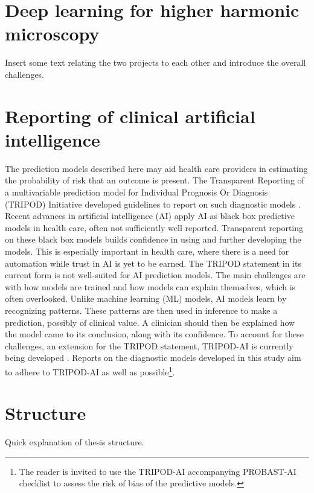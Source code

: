 \section{Deep learning for higher harmonic microscopy}
Insert some text relating the two projects to each other and introduce the overall challenges.

\section{Reporting of clinical artificial intelligence}
The prediction models described here may aid health care providers in estimating the probability of risk that an outcome is present.
The Transparent Reporting of a multivariable prediction model for Individual Prognosis Or Diagnosis (TRIPOD) Initiative developed guidelines to report on such diagnostic models \cite{Collins2015, Moons2015}.
Recent advances in artificial intelligence (AI) apply AI as black box predictive models in health care, often not sufficiently well reported.
Transparent reporting on these black box models builds confidence in using and further developing the models.
This is especially important in health care, where there is a need for automation while trust in AI is yet to be earned.
The TRIPOD statement in its current form is not well-suited for AI prediction models.
The main challenges are with how models are trained and how models can explain themselves, which is often overlooked.
Unlike machine learning (ML) models, AI models learn by recognizing patterns.
These patterns are then used in inference to make a prediction, possibly of clinical value.
A clinician should then be explained how the model came to its conclusion, along with its confidence.
To account for these challenges, an extension for the TRIPOD statement, TRIPOD-AI is currently being developed \cite{Collins2021,Collins2020}.
Reports on the diagnostic models developed in this study aim to adhere to TRIPOD-AI as well as possible\footnote{The reader is invited to use the TRIPOD-AI accompanying PROBAST-AI \cite{Wolff2019a, Wolff2019b, Collins2021} checklist to assess the risk of bias of the predictive models.}.

\section{Structure}
Quick explanation of thesis structure.